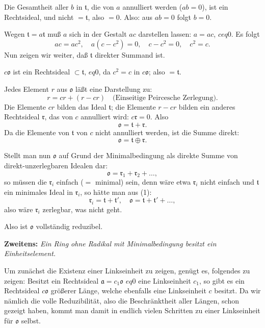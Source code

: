 \documentclass[12pt,a4paper]{article}
\newcommand{\dsum}{\oplus}              %
\theoremstyle{definition}
\begin{document}
Die Gesamtheit aller $b$ in $\mathfrak{t}$, die von $a$ annulliert
werden ($ab = 0$), ist ein Rechtsideal, und nicht $= \mathfrak{t}$,
also $= 0$. Also: aus $ab = 0$ folgt $b = 0$.

Wegen $\mathfrak{t} = a\mathfrak{t}$ mu\ss{} $a$ sich in der Gestalt
$ac$ darstellen lassen: $a = ac$, $c  eq 0$. Es folgt
\[
ac = ac^2, \quad a(c - c^2) = 0, \quad c - c^2 = 0, \quad c^2 = c.
\]
Nun zeigen wir weiter, da\ss{} $\mathfrak{t}$ direkter Summand ist.

$c\mathfrak{o}$ ist ein Rechtsideal $\subset \mathfrak{t}$, $ eq 0$, da
$c^2 = c$ in $c\mathfrak{o}$; also $= \mathfrak{t}$.

Jedes Element $r$ aus $\mathfrak{o}$ l\"a\ss t eine Darstellung zu:
\[
r = cr + (r - cr) \quad\text{(Einseitige Peircesche Zerlegung)}.
\]
Die Elemente $cr$ bilden das Ideal $\mathfrak{t}$; die Elemente $r-cr$
bilden ein anderes Rechtsideal $\mathfrak{r}$, das von $c$ annulliert
wird: $c\mathfrak{r} = 0$. Also
\[
\mathfrak{o} = \mathfrak{t} + \mathfrak{r}.
\]
Da die Elemente von $\mathfrak{t}$ von $c$ nicht annulliert werden, ist
die Summe direkt:
\[
\mathfrak{o} = \mathfrak{t} \dsum \mathfrak{r}.
\]

Stellt man nun $\mathfrak{o}$ auf Grund der Minimalbedingung als direkte
Summe von direkt-unzerlegbaren Idealen dar:
\[
\mathfrak{o} = \mathfrak{r}_1 + \mathfrak{r}_2 + \dots,
\]
so m\"ussen die $\mathfrak{r}_i$ einfach ($=$ minimal) sein, denn w\"are
etwa $\mathfrak{r}_i$ nicht einfach und $\mathfrak{t}$ ein minimales
Ideal in $\mathfrak{r}_i$, so h\"atte man aus (1):
\[
\mathfrak{r}_i = \mathfrak{t} + \mathfrak{t}', \quad
\mathfrak{o} = \mathfrak{t} + \mathfrak{t}' + \dots,
\]
also w\"are $\mathfrak{r}_i$ zerlegbar, was nicht geht.

Also ist $\mathfrak{o}$ vollst\"andig reduzibel.

\textbf{Zweitens:} \textit{Ein Ring ohne Radikal mit Minimalbedingung
besitzt ein Einheitselement.}

Um zun\"achst die Existenz einer Linkseinheit zu zeigen, gen\"ugt es,
folgendes zu zeigen: Besitzt ein Rechtsideal $\mathfrak{a} = c_1\mathfrak{o}$
$ eq 0$ eine Linkseinheit $c_1$, so gibt es ein Rechtsideal
$c\mathfrak{o}$ gr\"o\ss erer L\"ange, welche ebenfalls eine Linkseinheit
$c$ besitzt. Da wir n\"amlich die volle Reduzibilit\"at, also die
Beschr\"anktheit aller L\"angen, schon gezeigt haben, kommt man damit in
endlich vielen Schritten zu einer Linkseinheit f\"ur $\mathfrak{o}$ selbst.
\end{document}
